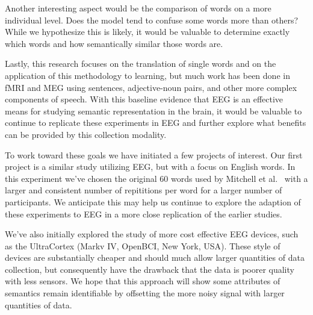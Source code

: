 Another interesting aspect would be the comparison of words on a more 
individual level. Does the model tend to confuse some words more than others?  
While we hypothesize this is likely, it would be valuable to determine exactly 
which words and how semantically similar those words are.

Lastly, this research focuses on the translation of single words and on the 
application of this methodology to learning, but much work has been done in 
fMRI and MEG using sentences, adjective-noun pairs, and other more complex 
components of speech. With this baseline evidence that EEG is an effective 
means for studying semantic representation in the brain, it would be valuable 
to continue to replicate these experiments in EEG and further explore what 
benefits can be provided by this collection modality.

To work toward these goals we have initiated a few projects of interest. Our 
first project is a similar study utilizing EEG, but with a focus on English 
words. In this experiment we've chosen the original 60 words used by Mitchell 
et al.~\cite{Mitchell2008} with a larger and consistent number of repititions 
per word for a larger number of participants.  We anticipate this may help us 
continue to explore the adaption of these experiments to EEG in a more close 
replication of the earlier studies.

We've also initially explored the study of more cost effective EEG devices, 
such as the UltraCortex (Markv IV, OpenBCI, New York, USA). These style of 
devices are substantially cheaper and should much allow larger quantities of 
data collection, but consequently have the drawback that the data is poorer 
quality with less sensors.  We hope that this approach will show some 
attributes of semantics remain identifiable by offsetting the more noisy signal 
with larger quantities of data.
